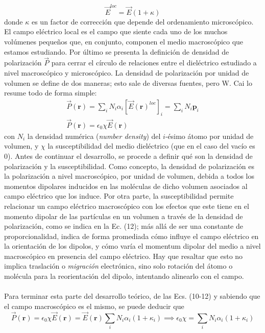 \documentclass[12pt, oneside, numbers, spanish]{ezthesis}
\numberwithin{equation}{section}
\begin{document}
\begin{equation}
\vec{E}^{loc} = \vec{E}(1 + \kappa)
\end{equation}
donde $\kappa$ es un factor de corrección que depende del ordenamiento microscópico. El campo eléctrico local es el campo que siente cada uno de los muchos volúmenes pequeños que, en conjunto, componen el medio macroscópico que estamos estudiando. Por último se presenta la definición de densidad de polarización $\vec{P}$ para cerrar el círculo de relaciones entre el dieléctrico estudiado a nivel macroscópico y microscópico. La densidad de polarización por unidad de volumen se define de dos maneras; esto sale de diversas fuentes, pero W. Cai \cite{Cai} lo resume todo de forma simple:
\begin{gather}
\vec{P}(\mathbf{r}) = \sum_i N_i\alpha_i\left[\vec{E}(\mathbf{r})^{loc}\right]_i = \sum_i N_i\mathbf{p}_i\\
\vec{P}(\mathbf{r}) = \epsilon_0\chi\vec{E}(\mathbf{r})
\end{gather}
con $N_i$ la densidad numérica (\textit{number density}) del $i$-ésimo átomo por unidad de volumen, y $\chi$ la susceptibilidad del medio dieléctrico (que en el caso del vacío es 0). Antes de continuar el desarrollo, se procede a definir qué son la densidad de polarización y la susceptibilidad. Como concepto, la densidad de polarización es la polarización a nivel macroscópico, por unidad de volumen, debida a todos los momentos dipolares inducidos en las moléculas de dicho volumen asociados al campo eléctrico que los induce. Por otra parte, la susceptibilidad permite relacionar un campo eléctrico macroscópico con los efectos que este tiene en el momento dipolar de las partículas en un volumen a través de la densidad de polarización, como se indica en la Ec. (12); más allá de ser una constante de proporcionalidad, indica de forma promediada cómo influye el campo eléctrico en la orientación de los dipolos, y cómo varía el momentum dipolar del medio a nivel macroscópico en presencia del campo eléctrico. Hay que resaltar que esto no implica traslación o \textit{migración} electrónica, sino solo rotación del átomo o molécula para la reorientación del dipolo, intentando alinearlo con el campo.\\\\
Para terminar esta parte del desarrollo teórico, de las Ecs. (10-12) y sabiendo que el campo macroscópico es el mismo, se puede deducir que
\begin{equation}
\vec{P}(\mathbf{r}) = \epsilon_0\chi\vec{E}(\mathbf{r}) = \vec{E}(\mathbf{r})\sum_iN_i\alpha_i(1+\kappa_i) \implies \epsilon_0\chi = \sum_iN_i\alpha_i(1+\kappa_i)
\end{equation}
\end{document}
